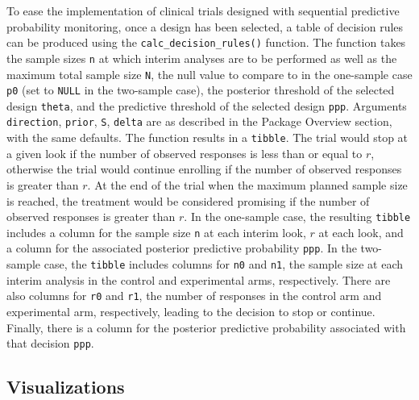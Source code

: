 To ease the implementation of clinical trials designed with sequential
predictive probability monitoring, once a design has been selected, a
table of decision rules can be produced using the
\texttt{calc\_decision\_rules()} function. The function takes the sample
sizes \texttt{n} at which interim analyses are to be performed as well
as the maximum total sample size \texttt{N}, the null value to compare
to in the one-sample case \texttt{p0} (set to \texttt{NULL} in the
two-sample case), the posterior threshold of the selected design
\texttt{theta}, and the predictive threshold of the selected design
\texttt{ppp}. Arguments \texttt{direction}, \texttt{prior}, \texttt{S},
\texttt{delta} are as described in the Package Overview section, with
the same defaults. The function results in a \texttt{tibble}. The trial
would stop at a given look if the number of observed responses is less
than or equal to \(r\), otherwise the trial would continue enrolling if
the number of observed responses is greater than \(r\). At the end of
the trial when the maximum planned sample size is reached, the treatment
would be considered promising if the number of observed responses is
greater than \(r\). In the one-sample case, the resulting
\texttt{tibble} includes a column for the sample size \texttt{n} at each
interim look, \(r\) at each look, and a column for the associated
posterior predictive probability \texttt{ppp}. In the two-sample case,
the \texttt{tibble} includes columns for \texttt{n0} and \texttt{n1},
the sample size at each interim analysis in the control and experimental
arms, respectively. There are also columns for \texttt{r0} and
\texttt{r1}, the number of responses in the control arm and experimental
arm, respectively, leading to the decision to stop or continue. Finally,
there is a column for the posterior predictive probability associated
with that decision \texttt{ppp}.

\hypertarget{visualizations}{%
\subsection{Visualizations}\label{visualizations}}

